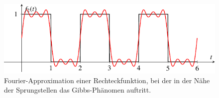 %
%
%
\begin{figure}
	\centering
	\includegraphics{papers/fourier/images/fourier_Rechteck.pdf}
	\caption{Fourier-Approximation einer Rechteckfunktion, bei der in der Nähe der Sprungstellen das Gibbs-Phänomen auftritt.%
	\label{fourier:fig:fourierrechteck}}
\end{figure}

